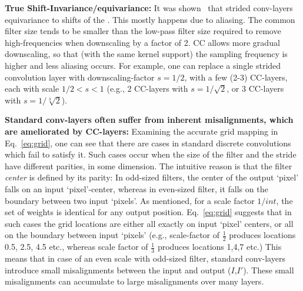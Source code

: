
\textbf{True Shift-Invariance/equivariance:} It was shown~\cite{zhang2019shiftinvar, azulay2018deep} that strided conv-layers 
equivariance to shifts of the . This mostly happens due to aliasing. The common filter size tends to be smaller than the low-pass filter size required to remove high-frequencies when downscaling by a factor of 2. CC allows more gradual downscaling, so that (with the same kernel support) the sampling frequency is higher and less aliasing occurs. For example, one can replace a single strided convolution layer with downscaling-factor $s=1/2$, with a few (2-3) CC-layers, each with scale $1/2 < s < 1$ (e.g., 2 CC-layers with $s=1/\sqrt{{2}}$, or 3 CC-layers with $s=1/\sqrt[3]{{2}}$).

\textbf{Standard conv-layers often suffer from inherent misalignments, which are ameliorated by CC-layers:} Examining the accurate grid mapping in Eq.~\ref{eq:grid}, one can see that there are cases in standard discrete convolutions which fail to satisfy it. Such cases occur when the size of the filter and the stride have different parities, in some dimension. The intuitive reason is that the filter \emph{center} is defined by its parity: In odd-sized filters, the center of the output `pixel' falls on an input `pixel'-center, whereas in even-sized filter, it falls on the boundary between two input `pixels'. As mentioned, for a scale factor $1/int$, the set of weights is identical for any output position. Eq.~\ref{eq:grid} suggests that in such cases the grid locations are either all exactly on input `pixel' centers, or all on the boundary between input `pixels' (e.g., scale-factor of $\frac{1}{2}$ produces locations 0.5, 2.5, 4.5 etc., whereas scale factor of $\frac{1}{3}$ produces locations 1,4,7 etc.) This means that in case of an even scale with odd-sized filter, standard conv-layers introduce small misalignments between the input and output ($I$,$I'$). These small  misalignments can accumulate to large misalignments over many layers. 

